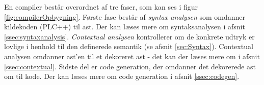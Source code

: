 En compiler består overordnet af tre faser, som kan ses i figur \ref{fig:compilerOpbygning}. Første fase består af \textit{syntax analysen} som omdanner kildekoden (PLC++) til \gls{ast}. Der kan læses mere om syntaksanalysen i afsnit \ref{ssec:syntaxanalysis}. \textit{Contextual analysen} kontrollerer om de konkrete udtryk er lovlige i henhold til den definerede semantik (se afsnit \ref{sec:Syntax}). Contextual analysen omdanner \gls{ast}'en til et dekoreret \gls{ast} - det kan der læses mere om i afsnit \ref{ssec:contextual}. Sidste del er code generation, der omdanner det dekorerede \gls{ast} om til kode. Der kan læses mere om code generation i afsnit \ref{ssec:codegen}.

